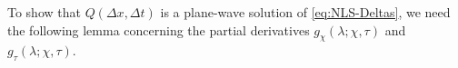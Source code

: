 To show that $Q(\Delta x, \Delta t)$ is a plane-wave solution of \eqref{eq:NLS-Deltas}, we need the following lemma concerning the partial derivatives $g_\chi(\lambda;\chi,\tau)$ and $g_\tau(\lambda;\chi,\tau)$.
%
%
%

